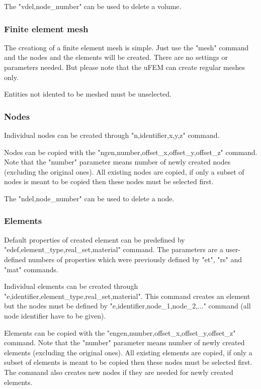 \documentclass{article}
\begin{document}
 The "vdel,node\_number" can be used to delete a volume.



\subsubsection{Finite element mesh}

 The creationg of a finite element mesh is simple.
 Just use the "mesh" command and the nodes and
 the elements will be created. There are no
 settings or parameters needed. But please note
 that the uFEM can create regular meshes only.

 Entities not idented to be meshed must be unselected.



\subsubsection{Nodes}

 Individual nodes can be created through "n,identifier,x,y,z"
 command.

 Nodes can be copied with the "ngen,number,offset\_x,offset\_y,offset\_z" command.
 Note that the "number" parameter means number of newly created
 nodes (excluding the original ones). All existing nodes
 are copied, if only a subset of nodes is meant to be copied
 then these nodes must be selected first.

 The "ndel,node\_number" can be used to delete a node.



\subsubsection{Elements}

 Default properties of created element can be predefined
 by "edef,element\_type,real\_set,material" command.
 The parameters are a user-defined numbers of properties which
 were previously defined by "et", "rs" and "mat" commands.

 Individual elements can be created through "e,identifier,element\_type,real\_set,material".
 This command creates an element but the nodes must be defined by
 "e,identifier,node\_1,node\_2,..." command (all node identifier have to be given).

 Elements can be copied with the "engen,number,offset\_x,offset\_y,offset\_z" command.
 Note that the "number" parameter means number of newly created
 elements (excluding the original ones). All existing elements
 are copied, if only a subset of elements is meant to be copied
 then these nodes must be selected first. The command also creates new nodes
 if they are needed for newly created elements.
\end{document}
